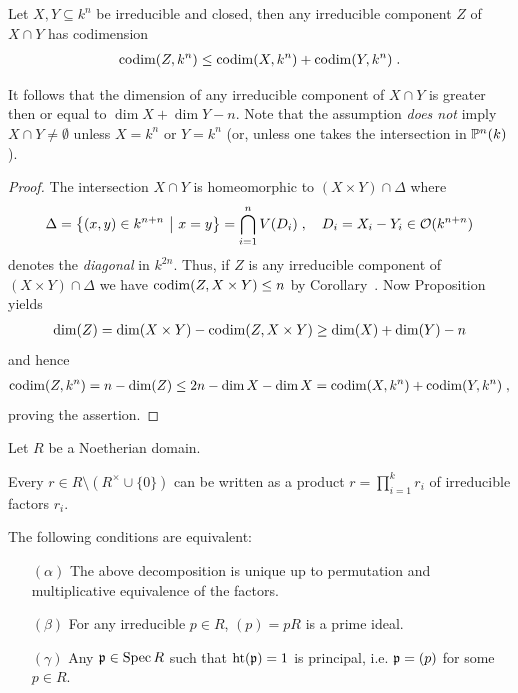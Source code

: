 \documentclass[a4paper,parskip=half,numbers=enddot, DIV=12]{scrreprt}
\begin{document}
\begin{thm}
    Let $X,Y\subseteq k^n$ be irreducible and closed, then any irreducible component $Z$ of $X\cap Y$ has codimension 
    \begin{align*}
    	\operatorname{codim}(Z,k^n)\leq\operatorname{codim}(X,k^n) +\operatorname{codim}(Y,k^n)\;.
    \end{align*}
\end{thm}
\begin{rem*}
    It follows that the dimension of any irreducible component of $X\cap Y$ is greater then or equal to $\dim X+\dim Y -n$. Note that the assumption \emph{does not} imply $X\cap Y \not= \emptyset$ unless $X=k^n$ or $Y=k^n$ (or, unless one takes the intersection in $\mathbb{P}^n(k)$).
\end{rem*}
\begin{proof}
    The intersection $X\cap Y$ is homeomorphic to $(X\times Y)\cap \Delta$ where 
    \begin{align*}
    	\Delta = \left\{(x,y)\in k^{n+n}\ \middle|\  x=y\right\} = \bigcap_{i=1}^n V(D_i)\;,\quad D_i = X_i -Y_i \in \mathcal{O}(k^{n+n})
    \end{align*}
    denotes the \emph{diagonal} in $k^{2n}$. Thus, if $Z$ is any irreducible component of $(X\times Y)\cap \Delta$ we have $\operatorname{codim}(Z,X\times Y) \leq n$ by Corollary~.  Now Proposition~ yields
    \begin{align*}
	    \dim(Z) = \dim(X\times Y) -\operatorname{codim}(Z,X\times Y) \geq \dim(X)+\dim(Y) -n
    \end{align*}
   and hence
   \begin{align*}
	   	\operatorname{codim}(Z,k^n) = n-\dim(Z) \leq 2n -\dim X -\dim X = \operatorname{codim}(X,k^n)+\operatorname{codim}(Y,k^n)\;,
   \end{align*}
   proving the assertion.
\end{proof}
\begin{thm}
 Let $R$ be a Noetherian domain. 
 \begin{alphanumerate}
    \item 
        Every $r\in R\setminus (R^\times \cup\{0\})$ can be written as a product $r = \prod_{i=1}^k r_i$ of irreducible factors $r_i$. 
    \item 
        The following conditions are equivalent:
        \begin{itemize}
            \item[$(\alpha)$]
                The above decomposition is unique up to permutation and multiplicative equivalence of the factors.
            \item[$(\beta)$]
                For any irreducible $p\in R$, $(p)=pR$ is a prime ideal.
            \item[$(\gamma)$]
                Any $\mathfrak{p}\in\operatorname{Spec} R$ such that $\operatorname{ht}(\mathfrak{p}) = 1$ is principal, i.e. $\mathfrak{p} = (p)$ for some $p\in R$.
        \end{itemize}
 \end{alphanumerate}
\end{thm}
\end{document}
